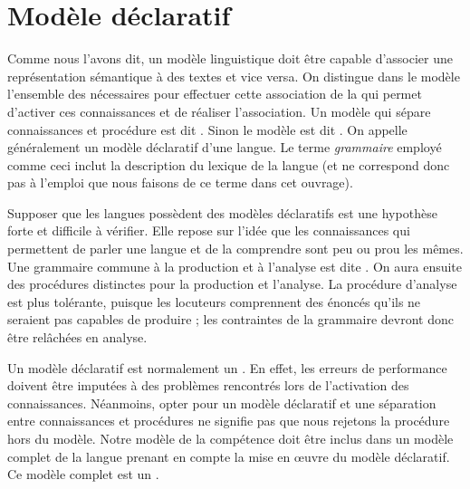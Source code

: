 \section{Modèle déclaratif}\label{sec:1.3.4}

Comme nous l’avons dit, un modèle linguistique doit être capable d’associer une représentation sémantique à des textes et vice versa. On distingue dans le modèle l’ensemble des  nécessaires pour effectuer cette association de la  qui permet d’activer ces connaissances et de réaliser l’association. Un modèle qui sépare connaissances et procédure est dit . Sinon le modèle est dit . On appelle généralement  un modèle déclaratif d’une langue. Le terme \textit{grammaire} employé comme ceci inclut la description du lexique de la langue (et ne correspond donc pas à l'emploi que nous faisons de ce terme dans cet ouvrage).

Supposer que les langues possèdent des modèles déclaratifs est une hypothèse forte et difficile à vérifier. Elle repose sur l’idée que les connaissances qui permettent de parler une langue et de la comprendre sont peu ou prou les mêmes. Une grammaire commune à la production et à l’analyse est dite . On aura ensuite des procédures distinctes pour la production et l’analyse. La procédure d’analyse est plus tolérante, puisque les locuteurs comprennent des énoncés qu’ils ne seraient pas capables de produire ; les contraintes de la grammaire devront donc être relâchées en analyse.

Un modèle déclaratif est normalement un . En effet, les erreurs de performance doivent être imputées à des problèmes rencontrés lors de l’activation des connaissances. Néanmoins, opter pour un modèle déclaratif et une séparation entre connaissances et procédures ne signifie pas que nous rejetons la procédure hors du modèle. Notre modèle de la compétence doit être inclus dans un modèle complet de la langue prenant en compte la mise en œuvre du modèle déclaratif. Ce modèle complet est un .


